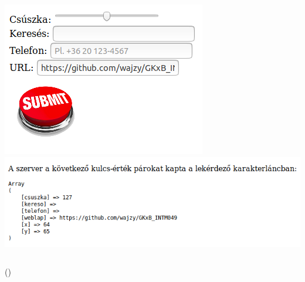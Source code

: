 \begin{frame}
  \begin{columns}[T]
      \includegraphics[width=\textwidth]{urlap6-1.png}
      \includegraphics[width=\textwidth]{urlap6-2.png}
  \end{columns}
\end{frame}

\begin{frame}
  \begin{exampleblock}{ 
  ()}
    \footnotesize
    
  \end{exampleblock}
\end{frame}

